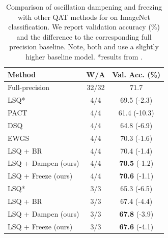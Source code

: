 \begin{table}[t]
    \centering
    \begin{tabular}{ l | c |  c }
    \toprule

  Method & W/A &    Val. Acc. (\%)  \\
        \midrule
Full-precision & 32/32 & 71.7 \\
\midrule
LSQ* \citep{lsq}         & 4/4 & 69.5 (-2.3) \\ %
PACT \cite{pact2018}    & 4/4 & 61.4  (-10.3)\\ %
DSQ \citep{DSQ}         & 4/4 & 64.8 (-6.9) \\
EWGS \citep{EWGS}       & 4/4 & 70.3 (-1.6) \\ %
LSQ + BR \citep{binreg} & 4/4 & 70.4 (-1.4)\\ %
LSQ + Dampen (ours)     & 4/4 & \textbf{70.5} (-1.2) \\
LSQ + Freeze (ours)     & 4/4 & \textbf{70.6} (-1.1) \\
\midrule
LSQ* \citep{lsq}         & 3/3 & 65.3 (-6.5)  \\
LSQ + BR \citep{binreg} & 3/3 & 67.4 (-4.4) \\
LSQ + Dampen (ours)     & 3/3 & \textbf{67.8} (-3.9)  \\
LSQ + Freeze (ours)     & 3/3 & \textbf{67.6} (-4.1) \\
\bottomrule
\end{tabular}
 \caption{Comparison of oscillation dampening and freezing with other QAT methods for  on ImageNet classification. We report validation accuracy (\%) and the difference to the corresponding full precision baseline. Note, both \citet{binreg} and \citet{EWGS} use a slightly higher baseline model. *results from \citet{binreg}.}
 \vspace{-0.1cm}
 \label{tbl:final_results_mnv2}
\end{table}


